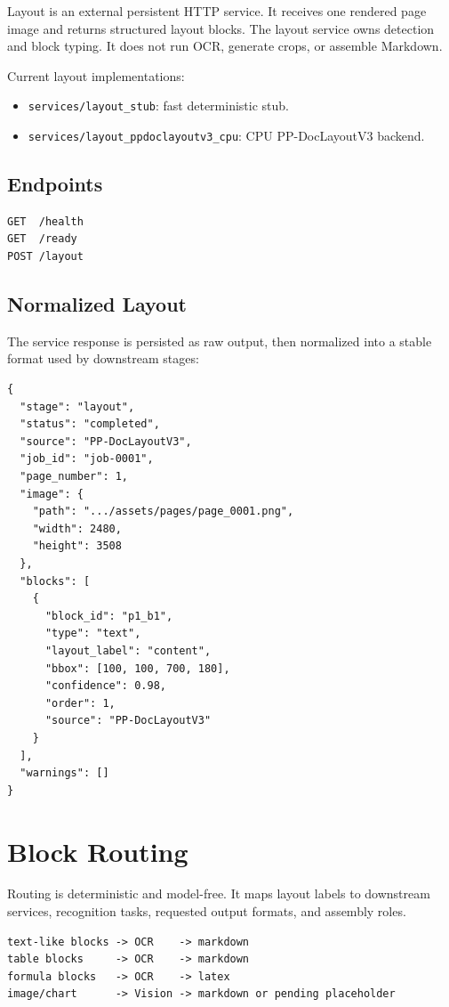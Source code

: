 \documentclass[11pt,a4paper]{article}
\begin{document}
Layout is an external persistent HTTP service. It receives one rendered page
image and returns structured layout blocks. The layout service owns detection
and block typing. It does not run OCR, generate crops, or assemble Markdown.

Current layout implementations:

\begin{itemize}[leftmargin=1.2cm]
\item \texttt{services/layout\_stub}: fast deterministic stub.
\item \texttt{services/layout\_ppdoclayoutv3\_cpu}: CPU PP-DocLayoutV3 backend.
\end{itemize}

\subsection{Endpoints}

\begin{lstlisting}
GET  /health
GET  /ready
POST /layout
\end{lstlisting}

\subsection{Normalized Layout}

The service response is persisted as raw output, then normalized into a stable
format used by downstream stages:

\begin{lstlisting}
{
  "stage": "layout",
  "status": "completed",
  "source": "PP-DocLayoutV3",
  "job_id": "job-0001",
  "page_number": 1,
  "image": {
    "path": ".../assets/pages/page_0001.png",
    "width": 2480,
    "height": 3508
  },
  "blocks": [
    {
      "block_id": "p1_b1",
      "type": "text",
      "layout_label": "content",
      "bbox": [100, 100, 700, 180],
      "confidence": 0.98,
      "order": 1,
      "source": "PP-DocLayoutV3"
    }
  ],
  "warnings": []
}
\end{lstlisting}

\section{Block Routing}

Routing is deterministic and model-free. It maps layout labels to downstream
services, recognition tasks, requested output formats, and assembly roles.

\begin{lstlisting}
text-like blocks -> OCR    -> markdown
table blocks     -> OCR    -> markdown
formula blocks   -> OCR    -> latex
image/chart      -> Vision -> markdown or pending placeholder
\end{lstlisting}
\end{document}
